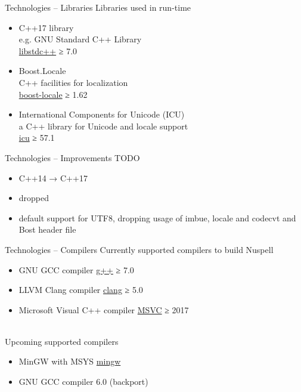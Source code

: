 \documentclass{beamer}
\begin{document}
\begin{frame}{Technologies – Libraries}
Libraries used in run-time
\\\mbox{}
\begin{itemize}
\item C++17 library\\
e.g. GNU Standard C++ Library\\
\href{https://gcc.gnu.org/}{libstdc++} ≥ 7.0
\\\mbox{}
\item Boost.Locale\\
C++ facilities for localization\\
\href{https://www.boost.org/doc/libs/1_69_0/libs/locale/doc/html/index.html}{boost-locale} ≥ 1.62
\\\mbox{}
\item International Components for Unicode (ICU)\\
a C++ library for Unicode and locale support\\
\href{http://site.icu-project.org/}{icu} ≥ 57.1
\end{itemize}
\end{frame}

\begin{frame}{Technologies – Improvements}
TODO
\\\mbox{}
\begin{itemize}
\item C++14 → C++17
\item dropped
\item default support for UTF8, dropping usage of imbue, locale and codecvt and Bost header file
\end{itemize}
\end{frame}

\begin{frame}{Technologies – Compilers}
Currently supported compilers to build Nuspell
\begin{itemize}
\item GNU GCC compiler \href{https://gcc.gnu.org/}{g++} ≥ 7.0
\item LLVM Clang compiler \href{https://clang.llvm.org/}{clang} ≥ 5.0
\item Microsoft Visual C++ compiler \href{https://docs.microsoft.com/en-us/cpp/}{MSVC} ≥ 2017
\end{itemize}
\mbox{}\\
Upcoming supported compilers
\begin{itemize}
\item MinGW with MSYS \href{http://mingw.org/}{mingw}
\item GNU GCC compiler 6.0 (backport)
\end{itemize}
\end{frame}
\end{document}
